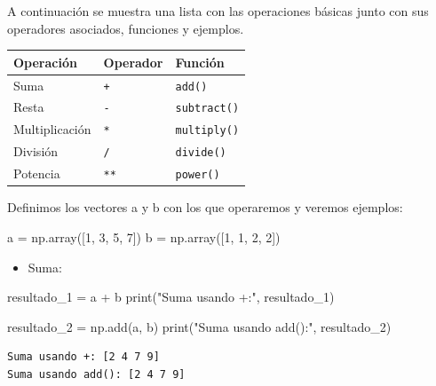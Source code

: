 \documentclass[
  letterpaper,
  DIV=11,
  numbers=noendperiod]{scrreprt}
\newenvironment{Shaded}{\begin{snugshade}}{\end{snugshade}}
\newcommand{\BuiltInTok}[1]{\textcolor[rgb]{0.00,0.23,0.31}{#1}}
\newcommand{\DecValTok}[1]{\textcolor[rgb]{0.68,0.00,0.00}{#1}}
\newcommand{\NormalTok}[1]{\textcolor[rgb]{0.00,0.23,0.31}{#1}}
\newcommand{\OperatorTok}[1]{\textcolor[rgb]{0.37,0.37,0.37}{#1}}
\newcommand{\StringTok}[1]{\textcolor[rgb]{0.13,0.47,0.30}{#1}}
\providecommand{\tightlist}{%
  \setlength{\itemsep}{0pt}\setlength{\parskip}{0pt}}\usepackage{longtable,booktabs,array}
\begin{document}
A continuación se muestra una lista con las operaciones básicas junto
con sus operadores asociados, funciones y ejemplos.

\begin{longtable}[]{@{}lll@{}}
\toprule\noalign{}
Operación & Operador & Función \\
\midrule\noalign{}
\endhead
\bottomrule\noalign{}
\endlastfoot
Suma & \texttt{+} & \texttt{add()} \\
Resta & \texttt{-} & \texttt{subtract()} \\
Multiplicación & \texttt{*} & \texttt{multiply()} \\
División & \texttt{/} & \texttt{divide()} \\
Potencia & \texttt{**} & \texttt{power()} \\
\end{longtable}

Definimos los vectores a y b con los que operaremos y veremos ejemplos:

\begin{Shaded}
\begin{Highlighting}[]
\NormalTok{a }\OperatorTok{=}\NormalTok{ np.array([}\DecValTok{1}\NormalTok{, }\DecValTok{3}\NormalTok{, }\DecValTok{5}\NormalTok{, }\DecValTok{7}\NormalTok{])}
\NormalTok{b }\OperatorTok{=}\NormalTok{ np.array([}\DecValTok{1}\NormalTok{, }\DecValTok{1}\NormalTok{, }\DecValTok{2}\NormalTok{, }\DecValTok{2}\NormalTok{])}
\end{Highlighting}
\end{Shaded}

\begin{itemize}
\tightlist
\item
  Suma:
\end{itemize}

\begin{Shaded}
\begin{Highlighting}[]
\NormalTok{resultado\_1 }\OperatorTok{=}\NormalTok{ a }\OperatorTok{+}\NormalTok{ b}
\BuiltInTok{print}\NormalTok{(}\StringTok{"Suma usando +:"}\NormalTok{, resultado\_1) }

\NormalTok{resultado\_2 }\OperatorTok{=}\NormalTok{ np.add(a, b)}
\BuiltInTok{print}\NormalTok{(}\StringTok{"Suma usando add():"}\NormalTok{, resultado\_2) }
\end{Highlighting}
\end{Shaded}

\begin{verbatim}
Suma usando +: [2 4 7 9]
Suma usando add(): [2 4 7 9]
\end{verbatim}
\end{document}
